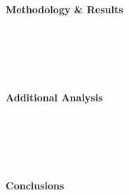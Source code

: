 \documentclass{beamer}
\begin{document}
\begin{frame}
\begin{columns}[T]
        \begin{column}{0.45\textwidth}
            \centering
            \textbf{Methodology \& Results}
            \vspace{0.1cm}
            
            \hyperlink{frame:research}{}\\[2pt]
            \hyperlink{frame:empirical}{}\\[2pt]
            \hyperlink{frame:eventstudy}{}\\[2pt]
            \hyperlink{frame:twfe_gpa_2_4_6_8}{}\\[2pt]
            \hyperlink{frame:twfe_gpa_2_4_8}{}
            \hyperlink{frame:twfe_gpa_controls}{}

            
            
            \vspace{0.2cm}
            \textbf{Additional Analysis}
            \vspace{0.1cm}
        
            \hyperlink{frame:otherstrategies}{}\\[2pt]
            \hyperlink{frame:iv_intro}{} \\[2pt]
            \hyperlink{frame:expectations}{} \\[2pt]
            \hyperlink{frame:dropout_risk}{} \\[2pt]
            \hyperlink{frame:ece_gender}{}

            \vspace{0.2cm}
            \textbf{Conclusions}
            \vspace{0.1cm}
            
            \hyperlink{frame:conclusions}{}
            
        \end{column}
    \end{columns}
    

\end{frame}
\end{document}
